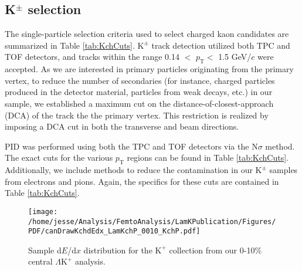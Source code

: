 \documentclass[ALICE,manyauthors]{cernphprep}
\newcommand{\pt}{$p_{\mathrm{T}}$\xspace}
\newcommand{\KchP}{$\mathrm{K^{+}}$\xspace}
\newcommand{\Kpm}{$\mathrm{K^{\pm}}$\xspace}
\newcommand{\LamKchP}{$\Lambda\mathrm{K^{+}}$\xspace}
\begin{document}
\subsection{K$^{\pm}$ selection}
\label{sec:KchSelection}
The single-particle selection criteria used to select charged kaon candidates are summarized in Table \ref{tab:KchCuts}.
\Kpm track detection utilized both TPC and TOF detectors, and tracks within the range 0.14 $<$ \pt $<$ 1.5 GeV/$c$ were accepted.
As we are interested in primary particles originating from the primary vertex, to reduce the number of secondaries (for instance, charged particles produced in the detector material, particles from weak decays, etc.) in our sample, we established a maximum cut on the distance-of-closest-approach (DCA) of the track the the primary vertex.
This restriction is realized by imposing a DCA cut in both the transverse and beam directions.

PID was performed using both the TPC and TOF detectors via the $\mathrm{N}\sigma$ method.  
The exact cuts for the various \pt regions can be found in Table \ref{tab:KchCuts}.  
Additionally, we include methods to reduce the contamination in our \Kpm samples from electrons and pions.  Again, the specifics for these cuts are contained in Table \ref{tab:KchCuts}.


\begin{figure}[h]
 \centering
 \texttt{[image: /home/jesse/Analysis/FemtoAnalysis/LamKPublication/Figures/PDF/canDrawKchdEdx\_LamKchP\_0010\_KchP.pdf]}%
 \caption{\label{fig:KchPdEdx} Sample d$E$/d$x$ distribution for the \KchP collection from our 0-10\% central \LamKchP analysis.}
\end{figure}
\end{document}
